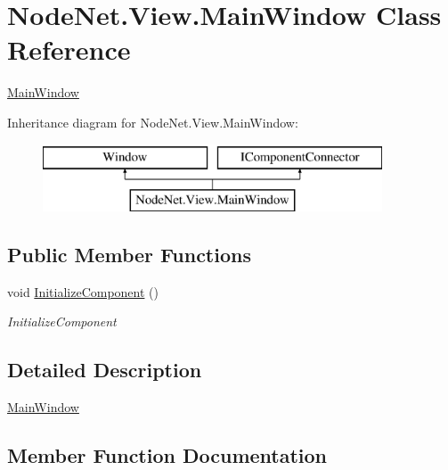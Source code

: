 \hypertarget{class_node_net_1_1_view_1_1_main_window}{}\section{Node\+Net.\+View.\+Main\+Window Class Reference}
\label{class_node_net_1_1_view_1_1_main_window}


\hyperlink{class_node_net_1_1_view_1_1_main_window}{Main\+Window}  


Inheritance diagram for Node\+Net.\+View.\+Main\+Window\+:\begin{figure}[H]
\begin{center}
\leavevmode
\includegraphics[height=2.000000cm]{class_node_net_1_1_view_1_1_main_window}
\end{center}
\end{figure}
\subsection*{Public Member Functions}
\begin{DoxyCompactItemize}
\item 
void \hyperlink{class_node_net_1_1_view_1_1_main_window_ad2e4a4dadb162b0306b125fd998e0f10}{Initialize\+Component} ()
\begin{DoxyCompactList}\small\item\em Initialize\+Component \end{DoxyCompactList}\end{DoxyCompactItemize}


\subsection{Detailed Description}
\hyperlink{class_node_net_1_1_view_1_1_main_window}{Main\+Window} 



\subsection{Member Function Documentation}
\mbox{\label{class_node_net_1_1_view_1_1_main_window_ad2e4a4dadb162b0306b125fd998e0f10}} 
